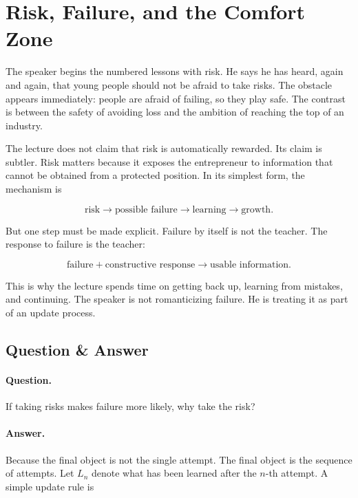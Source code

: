 \section{Risk, Failure, and the Comfort Zone}

The speaker begins the numbered lessons with risk. He says he has heard, again and again, that young people should not be afraid to take risks. The obstacle appears immediately: people are afraid of failing, so they play safe. The contrast is between the safety of avoiding loss and the ambition of reaching the top of an industry.

The lecture does not claim that risk is automatically rewarded. Its claim is subtler. Risk matters because it exposes the entrepreneur to information that cannot be obtained from a protected position. In its simplest form, the mechanism is

\begin{equation}
\text{risk}
\longrightarrow
\text{possible failure}
\longrightarrow
\text{learning}
\longrightarrow
\text{growth}.
\end{equation}

But one step must be made explicit. Failure by itself is not the teacher. The response to failure is the teacher:

\begin{equation}
\text{failure}+\text{constructive response}
\longrightarrow
\text{usable information}.
\end{equation}

This is why the lecture spends time on getting back up, learning from mistakes, and continuing. The speaker is not romanticizing failure. He is treating it as part of an update process.

\subsection{Question \& Answer}

\paragraph{Question.}
If taking risks makes failure more likely, why take the risk?

\paragraph{Answer.}
Because the final object is not the single attempt. The final object is the sequence of attempts. Let \(L_n\) denote what has been learned after the \(n\)-th attempt. A simple update rule is

